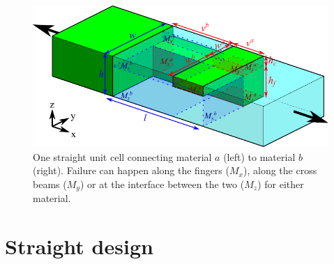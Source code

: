 
\newcommand{\hc}{h_\text{c}}
\newcommand{\hf}{h_\text{f}}

\newcommand{\sigmafail}{\sigma_\text{y}}
\newcommand{\taufail}{\tau_\text{y}}
\newcommand{\tauz}{\tau_\text{yZ}}

\begin{figure}[H]
	\centering
	\includegraphics[width=\columnwidth]{sources/method/straight_model_v3.pdf}
	\caption{
		One straight unit cell connecting material $a$ (left) to material $b$ (right).
		Failure can happen along the fingers ($M_x$), along the cross beams ($M_y$) or at the interface between the two ($M_z$) for either material.}
	\label{fig:failure_modes}
\end{figure}


\section{Straight design}

